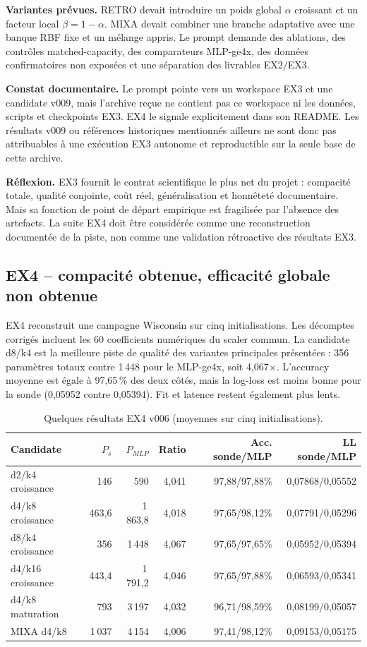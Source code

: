 \documentclass[11pt,a4paper]{article}
\begin{document}
\textbf{Variantes prévues.} RETRO devait introduire un poids global \(\alpha\) croissant et un facteur local \(\beta=1-\alpha\). MIXA devait combiner une branche adaptative avec une banque RBF fixe et un mélange appris. Le prompt demande des ablations, des contrôles matched-capacity, des comparateurs MLP-ge4x, des données confirmatoires non exposées et une séparation des livrables EX2/EX3.

\textbf{Constat documentaire.} Le prompt pointe vers un workspace EX3 et une candidate v009, mais l'archive reçue ne contient pas ce workspace ni les données, scripts et checkpoints EX3. EX4 le signale explicitement dans son README. Les résultats v009 ou références historiques mentionnés ailleurs ne sont donc pas attribuables à une exécution EX3 autonome et reproductible sur la seule base de cette archive.

\textbf{Réflexion.} EX3 fournit le contrat scientifique le plus net du projet : compacité totale, qualité conjointe, coût réel, généralisation et honnêteté documentaire. Mais sa fonction de point de départ empirique est fragilisée par l'absence des artefacts. La suite EX4 doit être considérée comme une reconstruction documentée de la piste, non comme une validation rétroactive des résultats EX3.

\subsection{EX4 -- compacité obtenue, efficacité globale non obtenue}

EX4 reconstruit une campagne Wisconsin sur cinq initialisations. Les décomptes corrigés incluent les 60 coefficients numériques du scaler commun. La candidate d8/k4 est la meilleure piste de qualité des variantes principales présentées : 356 paramètres totaux contre 1\,448 pour le MLP-ge4x, soit 4,067\(\times\). L'accuracy moyenne est égale à 97,65\,\% des deux côtés, mais la log-loss est moins bonne pour la sonde (0,05952 contre 0,05394). Fit et latence restent également plus lents.

\begin{table}[H]
\centering\small
\caption{Quelques résultats EX4 v006 (moyennes sur cinq initialisations).}
\begin{tabularx}{\textwidth}{lrrrrr}
\toprule
Candidate & \(P_s\) & \(P_{MLP}\) & Ratio & Acc. sonde/MLP & LL sonde/MLP\\
\midrule
d2/k4 croissance & 146 & 590 & 4,041 & 97,88/97,88\% & 0,07868/0,05552\\
d4/k8 croissance & 463,6 & 1\,863,8 & 4,018 & 97,65/98,12\% & 0,07791/0,05296\\
d8/k4 croissance & 356 & 1\,448 & 4,067 & 97,65/97,65\% & 0,05952/0,05394\\
d4/k16 croissance & 443,4 & 1\,791,2 & 4,046 & 97,65/97,88\% & 0,06593/0,05341\\
d4/k8 maturation & 793 & 3\,197 & 4,032 & 96,71/98,59\% & 0,08199/0,05057\\
MIXA d4/k8 & 1\,037 & 4\,154 & 4,006 & 97,41/98,12\% & 0,09153/0,05175\\
\bottomrule
\end{tabularx}
\end{table}
\end{document}
